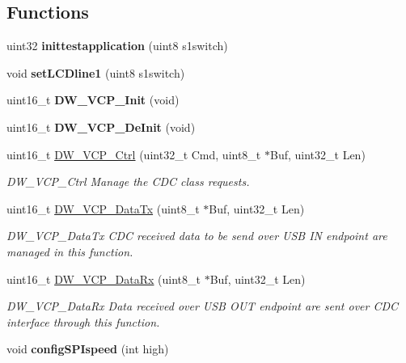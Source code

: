 \subsection*{Functions}
\begin{DoxyCompactItemize}
\item 
\hypertarget{group__USB__VCP__Private__Variables_ga6d95e46b979b0426caba7773822c8a4c}{uint32 {\bfseries inittestapplication} (uint8 s1switch)}\label{group__USB__VCP__Private__Variables_ga6d95e46b979b0426caba7773822c8a4c}

\item 
\hypertarget{group__USB__VCP__Private__Variables_ga574ae666fa6f17d97de75da97a694faf}{void {\bfseries set\-L\-C\-Dline1} (uint8 s1switch)}\label{group__USB__VCP__Private__Variables_ga574ae666fa6f17d97de75da97a694faf}

\item 
\hypertarget{group__USB__VCP__Private__Variables_gad3e3a742cb326bee02d8fc63e9109d65}{uint16\-\_\-t {\bfseries D\-W\-\_\-\-V\-C\-P\-\_\-\-Init} (void)}\label{group__USB__VCP__Private__Variables_gad3e3a742cb326bee02d8fc63e9109d65}

\item 
\hypertarget{group__USB__VCP__Private__Variables_gaa10233a5f1e85ab0b9d6e0d01bd5b62d}{uint16\-\_\-t {\bfseries D\-W\-\_\-\-V\-C\-P\-\_\-\-De\-Init} (void)}\label{group__USB__VCP__Private__Variables_gaa10233a5f1e85ab0b9d6e0d01bd5b62d}

\item 
uint16\-\_\-t \hyperlink{group__USB__VCP__Private__Variables_ga2e3b17bc984eea2a7b76e7b7d9d0406f}{D\-W\-\_\-\-V\-C\-P\-\_\-\-Ctrl} (uint32\-\_\-t Cmd, uint8\-\_\-t $\ast$Buf, uint32\-\_\-t Len)
\begin{DoxyCompactList}\small\item\em D\-W\-\_\-\-V\-C\-P\-\_\-\-Ctrl Manage the C\-D\-C class requests. \end{DoxyCompactList}\item 
uint16\-\_\-t \hyperlink{group__USB__VCP__Private__Variables_ga6dea74c462d6a2e1bbc1a9aa150e1f68}{D\-W\-\_\-\-V\-C\-P\-\_\-\-Data\-Tx} (uint8\-\_\-t $\ast$Buf, uint32\-\_\-t Len)
\begin{DoxyCompactList}\small\item\em D\-W\-\_\-\-V\-C\-P\-\_\-\-Data\-Tx C\-D\-C received data to be send over U\-S\-B I\-N endpoint are managed in this function. \end{DoxyCompactList}\item 
uint16\-\_\-t \hyperlink{group__USB__VCP__Private__Variables_ga6778c75f7602672145a342312f164403}{D\-W\-\_\-\-V\-C\-P\-\_\-\-Data\-Rx} (uint8\-\_\-t $\ast$Buf, uint32\-\_\-t Len)
\begin{DoxyCompactList}\small\item\em D\-W\-\_\-\-V\-C\-P\-\_\-\-Data\-Rx Data received over U\-S\-B O\-U\-T endpoint are sent over C\-D\-C interface through this function. \end{DoxyCompactList}\item 
\hypertarget{group__USB__VCP__Private__Variables_gae16a756f95245b1db98355b174e4c635}{void {\bfseries config\-S\-P\-Ispeed} (int high)}\label{group__USB__VCP__Private__Variables_gae16a756f95245b1db98355b174e4c635}


\end{DoxyCompactItemize}
